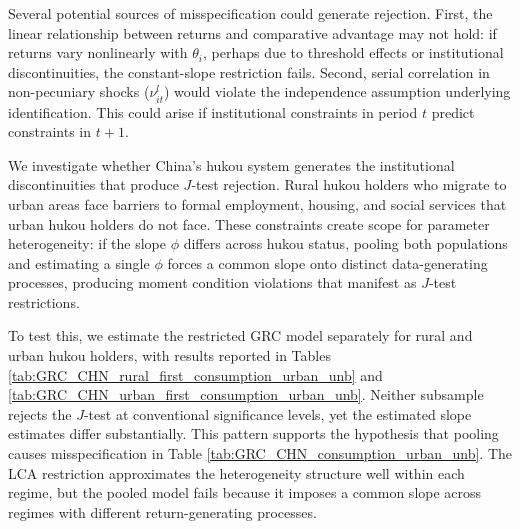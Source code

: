\documentclass[12pt]{article}
\begin{document}
Several potential sources of misspecification could generate rejection. 
First, the linear relationship between returns and comparative advantage may not hold: if returns vary nonlinearly with $\theta_i$, perhaps due to threshold effects or institutional discontinuities, the constant-slope restriction fails.
Second, serial correlation in non-pecuniary shocks ($\nu_{it}^l$) would violate the independence assumption underlying identification. 
This could arise if institutional constraints in period $t$ predict constraints in $t+1$.

We investigate whether China's hukou system generates the institutional discontinuities that produce $J$-test rejection.
Rural hukou holders who migrate to urban areas face barriers to formal employment, housing, and social services that urban hukou holders do not face.
These constraints create scope for parameter heterogeneity: if the slope $\phi$ differs across hukou status, pooling both populations and estimating a single $\phi$ forces a common slope onto distinct data-generating processes, producing moment condition violations that manifest as $J$-test restrictions.


To test this, we estimate the restricted GRC model separately for rural and urban hukou holders, with results reported in Tables \ref{tab:GRC_CHN_rural_first_consumption_urban_unb} and \ref{tab:GRC_CHN_urban_first_consumption_urban_unb}. 
Neither subsample rejects the $J$-test at conventional significance levels, yet the estimated slope estimates differ substantially. %
This pattern supports the hypothesis that pooling causes misspecification in Table \ref{tab:GRC_CHN_consumption_urban_unb}.
The LCA restriction approximates the heterogeneity structure well within each regime, but the pooled model fails because it imposes a common slope across regimes with different return-generating processes.

\end{document}
